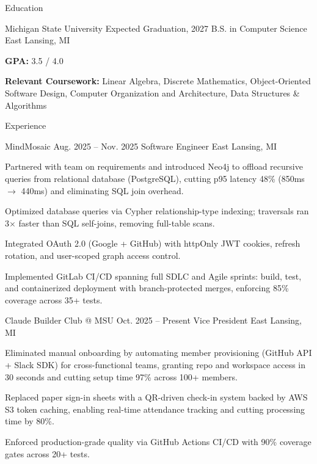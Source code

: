 \documentclass[
	11pt
]{../../../resume}
\begin{document}
	\begin{rSection}{E}{ducation}
		\begin{rSectionEntry}
			{Michigan State University}
			{Expected Graduation, 2027}
			{B.S. in Computer Science}
			{}
			{East Lansing, MI}

			\item \textbf{GPA:} 3.5 / 4.0
			\item \textbf{Relevant Coursework:} Linear Algebra, Discrete Mathematics, Object-Oriented Software Design, Computer Organization and Architecture, Data Structures \& Algorithms
		\end{rSectionEntry}
	\end{rSection}

	\begin{rSection}{E}{xperience}
		\begin{rSectionEntry}
			{MindMosaic}
			{Aug. 2025 -- Nov. 2025}
			{Software Engineer}
			{}
			{East Lansing, MI}

			\item Partnered with team on requirements and introduced Neo4j to offload recursive queries from relational database (PostgreSQL), cutting p95 latency 48\% (850ms $\rightarrow$ 440ms) and eliminating SQL join overhead.
			\item Optimized database queries via Cypher relationship-type indexing; traversals ran 3$\times$ faster than SQL self-joins, removing full-table scans.
			\item Integrated OAuth 2.0 (Google + GitHub) with httpOnly JWT cookies, refresh rotation, and user-scoped graph access control.
			\item Implemented GitLab CI/CD spanning full SDLC and Agile sprints: build, test, and containerized deployment with branch-protected merges, enforcing 85\% coverage across 35+ tests.
		\end{rSectionEntry}

		\begin{rSectionEntry}
			{Claude Builder Club @ MSU}
			{Oct. 2025 -- Present}
			{Vice President}
			{}
			{East Lansing, MI}

			\item Eliminated manual onboarding by automating member provisioning (GitHub API + Slack SDK) for cross-functional teams, granting repo and workspace access in 30 seconds and cutting setup time 97\% across 100+ members.
			\item Replaced paper sign-in sheets with a QR-driven check-in system backed by AWS S3 token caching, enabling real-time attendance tracking and cutting processing time by 80\%.
			\item Enforced production-grade quality via GitHub Actions CI/CD with 90\% coverage gates across 20+ tests.
		\end{rSectionEntry}
	\end{rSection}
\end{document}
